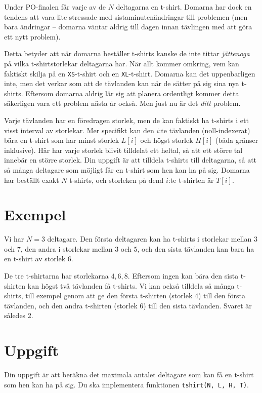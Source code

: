 \newcommand\version{v1}
Under PO-finalen får varje av de $N$ deltagarna en t-shirt. Domarna har dock en tendens att vara lite
stressade med sistaminutenändringar till problemen (men bara ändringar -- domarna väntar aldrig
till dagen innan tävlingen med att göra ett nytt problem).

Detta betyder att när domarna beställer t-shirts kanske de inte tittar \emph{jättenoga} på vilka
t-shirtstorlekar deltagarna har. När allt kommer omkring, vem kan faktiskt
skilja på en \texttt{XS}-t-shirt och en \texttt{XL}-t-shirt. Domarna kan det uppenbarligen inte, men
det verkar som att de tävlanden kan när de sätter på sig sina nya t-shirts.
Eftersom domarna aldrig lär sig att planera ordentligt kommer detta säkerligen vara ett problem nästa år också.
Men just nu är det \emph{ditt} problem.

Varje tävlanden har en föredragen storlek, men de kan faktiskt ha t-shirts i ett visst interval av storlekar.
Mer specifikt kan den $i$:te tävlanden (noll-indexerat) bära en t-shirt som har minst storlek $L[i]$ och högst
storlek $H[i]$ (båda gränser inklusive).
Här har varje storlek blivit tilldelat ett heltal, så att ett större tal innebär en större storlek.
Din uppgift är att tilldela t-shirts till deltagarna, så att så många deltagare som möjligt får en
t-shirt som hen kan ha på sig. Domarna har beställt exakt $N$ t-shirts, och storleken på dend $i$:te t-shirten
är $T[i]$.

\section*{Exempel}
Vi har $N = 3$ deltagare. Den första deltagaren kan ha t-shirts i storlekar mellan $3$ och $7$, 
den andra i storlekar mellan $3$ och $5$, och den sista tävlanden kan bara ha en t-shirt av storlek $6$.

De tre t-shirtarna har storlekarna $4, 6, 8$. Eftersom ingen kan bära den sista t-shirten kan högst
två tävlanden få t-shirts. Vi kan också tilldela så många t-shirts, till exempel genom att ge den
första t-shirten (storlek $4$) till den första tävlanden, och den andra t-shirten (storlek $6$) till den
sista tävlanden. Svaret är således 2.

\section*{Uppgift}
Din uppgift är att beräkna det maximala antalet deltagare som kan få en t-shirt som hen kan ha på sig.
Du ska implementera funktionen \texttt{tshirt(N, L, H, T)}.

